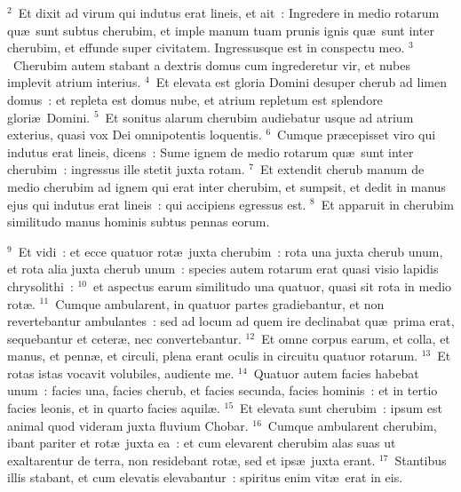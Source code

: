 ${}^{2}$~Et dixit ad virum qui indutus erat lineis, et ait~: Ingredere in medio rotarum qu\ae\ sunt subtus cherubim, et imple manum tuam prunis ignis qu\ae\ sunt inter cherubim, et effunde super civitatem. Ingressusque est in conspectu meo.
${}^{3}$~Cherubim autem stabant a dextris domus cum ingrederetur vir, et nubes implevit atrium interius.
${}^{4}$~Et elevata est gloria Domini desuper cherub ad limen domus~: et repleta est domus nube, et atrium repletum est splendore glori\ae\ Domini.
${}^{5}$~Et sonitus alarum cherubim audiebatur usque ad atrium exterius, quasi vox Dei omnipotentis loquentis.
${}^{6}$~Cumque pr\ae cepisset viro qui indutus erat lineis, dicens~: Sume ignem de medio rotarum qu\ae\ sunt inter cherubim~: ingressus ille stetit juxta rotam.
${}^{7}$~Et extendit cherub manum de medio cherubim ad ignem qui erat inter cherubim, et sumpsit, et dedit in manus ejus qui indutus erat lineis~: qui accipiens egressus est.
${}^{8}$~Et apparuit in cherubim similitudo manus hominis subtus pennas eorum.


${}^{9}$~Et vidi~: et ecce quatuor rot\ae\ juxta cherubim~: rota una juxta cherub unum, et rota alia juxta cherub unum~: species autem rotarum erat quasi visio lapidis chrysolithi~:
${}^{10}$~et aspectus earum similitudo una quatuor, quasi sit rota in medio rot\ae .
${}^{11}$~Cumque ambularent, in quatuor partes gradiebantur, et non revertebantur ambulantes~: sed ad locum ad quem ire declinabat qu\ae\ prima erat, sequebantur et ceter\ae , nec convertebantur.
${}^{12}$~Et omne corpus earum, et colla, et manus, et penn\ae , et circuli, plena erant oculis in circuitu quatuor rotarum.
${}^{13}$~Et rotas istas vocavit volubiles, audiente me.
${}^{14}$~Quatuor autem facies habebat unum~: facies una, facies cherub, et facies secunda, facies hominis~: et in tertio facies leonis, et in quarto facies aquil\ae .
${}^{15}$~Et elevata sunt cherubim~: ipsum est animal quod videram juxta fluvium Chobar.
${}^{16}$~Cumque ambularent cherubim, ibant pariter et rot\ae\ juxta ea~: et cum elevarent cherubim alas suas ut exaltarentur de terra, non residebant rot\ae , sed et ips\ae\ juxta erant.
${}^{17}$~Stantibus illis stabant, et cum elevatis elevabantur~: spiritus enim vit\ae\ erat in eis.


